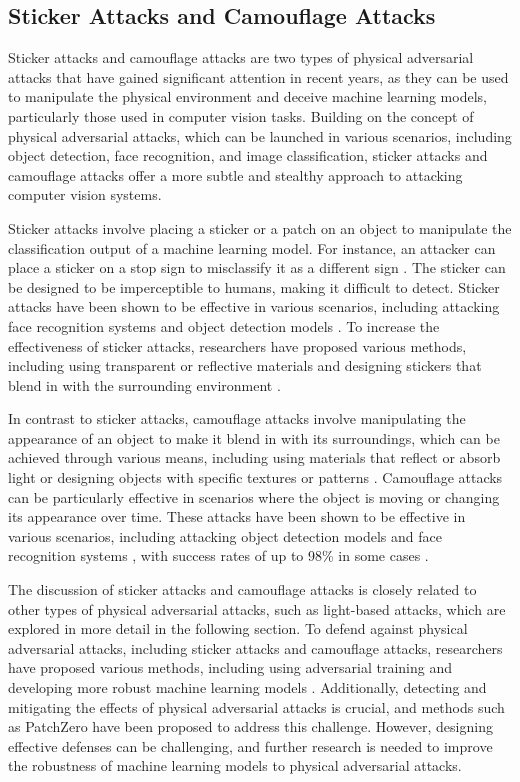 \documentclass[11pt]{article}
\begin{document}
\subsection{Sticker Attacks and Camouflage Attacks}

Sticker attacks and camouflage attacks are two types of physical adversarial attacks that have gained significant attention in recent years, as they can be used to manipulate the physical environment and deceive machine learning models, particularly those used in computer vision tasks. Building on the concept of physical adversarial attacks, which can be launched in various scenarios, including object detection, face recognition, and image classification, sticker attacks and camouflage attacks offer a more subtle and stealthy approach to attacking computer vision systems.

Sticker attacks involve placing a sticker or a patch on an object to manipulate the classification output of a machine learning model. For instance, an attacker can place a sticker on a stop sign to misclassify it as a different sign \cite{ref52}. The sticker can be designed to be imperceptible to humans, making it difficult to detect. Sticker attacks have been shown to be effective in various scenarios, including attacking face recognition systems \cite{ref53} and object detection models \cite{ref54}. To increase the effectiveness of sticker attacks, researchers have proposed various methods, including using transparent or reflective materials \cite{ref55} and designing stickers that blend in with the surrounding environment \cite{ref56}.

In contrast to sticker attacks, camouflage attacks involve manipulating the appearance of an object to make it blend in with its surroundings, which can be achieved through various means, including using materials that reflect or absorb light \cite{ref57} or designing objects with specific textures or patterns \cite{ref35}. Camouflage attacks can be particularly effective in scenarios where the object is moving or changing its appearance over time. These attacks have been shown to be effective in various scenarios, including attacking object detection models \cite{ref35} and face recognition systems \cite{ref58}, with success rates of up to 98\% in some cases \cite{ref35}.

The discussion of sticker attacks and camouflage attacks is closely related to other types of physical adversarial attacks, such as light-based attacks, which are explored in more detail in the following section. To defend against physical adversarial attacks, including sticker attacks and camouflage attacks, researchers have proposed various methods, including using adversarial training \cite{ref59} and developing more robust machine learning models \cite{ref60}. Additionally, detecting and mitigating the effects of physical adversarial attacks is crucial, and methods such as PatchZero \cite{ref61} have been proposed to address this challenge. However, designing effective defenses can be challenging, and further research is needed to improve the robustness of machine learning models to physical adversarial attacks.
\end{document}
